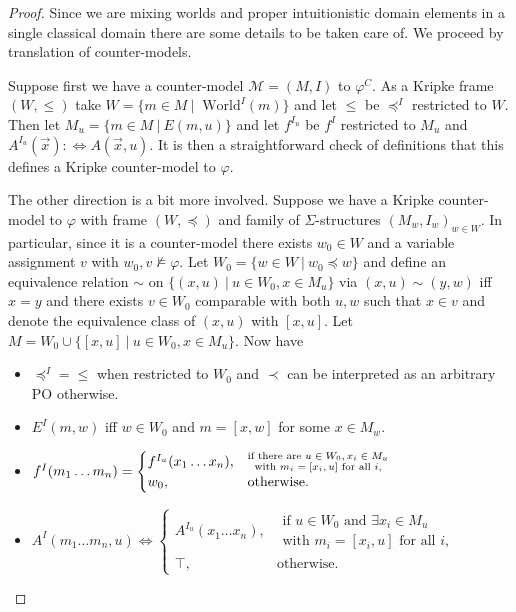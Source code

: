 \documentclass[runningheads]{llncs}
\begin{document}
\begin{proof}
	Since we are mixing worlds and proper intuitionistic domain elements in a single classical domain there are some details to be taken care of. We proceed by translation of counter-models.
	
	Suppose first we have a counter-model $\mathcal M = (M, I)$ to $\varphi^C$. As a Kripke frame $(W, \leq)$ take $ W = \{m\in M\:|\:\text{ World}^I(m)\}$ and let $\leq$ be $\preceq^I$ restricted to $W$. Then let $M_u = \{m\in M\:|\: E(m, u)\}$ and let $f^{I_u}$ be $f^I$ restricted to $M_u$ and $A^{I_u}(\vec x): \Leftrightarrow A(\vec x, u)$. It is then a straightforward check of definitions that this defines a Kripke counter-model to $\varphi$.
	
	The other direction is a bit more involved. Suppose we have a Kripke counter-model to $\varphi$ with frame $(W, \preceq)$ and family of $\Sigma$-structures $(M_w, I_w)_{w\in W}$. In particular, since it is a counter-model there exists $w_0\in W$ and a variable assignment $v$ with $w_0, v\not\models\varphi$. Let $W_0 = \{w\in W\:|\: w_0\preceq w\}$ and define an equivalence relation $\sim$ on $\{(x, u)\:|\:u\in W_0, x\in M_u\}$ via $(x, u)\sim (y, w)$ iff $x = y$ and there exists $v\in W_0$ comparable with both $u, w$ such that $x\in v$ and denote the equivalence class of $(x, u)$ with $[x, u]$. Let $M = W_0\cup \{[x, u]\:|\:u\in W_0, x\in M_u\}$.
	Now have
	\begin{itemize}
		\item $\preceq^I = \leq$ when restricted to $W_0$ and $\prec$ can be interpreted as an arbitrary PO otherwise.
		\item $E^I(m, w)$ iff $w\in W_0$ and $m = [x, w]$ for some $x\in M_w$.
		\item $f^I(m_1\dots m_n) =\begin{cases}
			f^{I_u}(x_1\dots x_n), &\substack{\text{if there are $ u\in W_0, x_i\in M_u$}\\ \text{with $m_i= [x_i, u]$ for all $i$,}}\\
			w_0, & \text{otherwise.}
		\end{cases}$
		\item ${A}^I(m_1\dots m_n, u) \Leftrightarrow\begin{cases}
			A^{I_u}(x_1\dots x_n), &\substack{\text{if $u\in W_0$ and $\exists x_i\in M_u$}\\\text{with $m_i= [x_i, u]$ for all $i$,}}\\
			\top, & \text{otherwise.}
		\end{cases}$

\end{itemize}
\end{proof}
\end{document}
